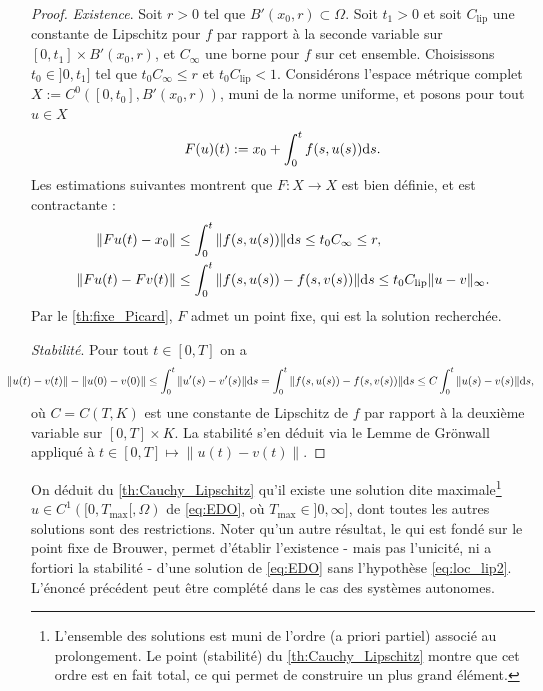 \begin{proof}
	\emph{Existence}.
	Soit $r>0$ tel que $B'(x_0,r) \subset \Omega$. Soit $t_1 > 0$ et soit $C_{\mathrm{lip}}$ une constante de Lipschitz pour $f$ par rapport à la seconde variable sur $[0,t_1] \times B'(x_0,r)$, et $C_\infty$ une borne pour $f$ sur cet ensemble. 
	Choisissons $t_0 \in ]0,t_1]$ tel que $t_0 C_\infty \leq r$ et $t_0 C_{\mathrm{lip}} <1$. 
	Considérons l'espace métrique complet $X := C^0([0,t_0],B'(x_0,r))$, muni de la norme uniforme, et posons pour tout $u \in X$ 
	\begin{equation*}
		F (u) (t) := x_0 + \int_0^t f(s,u(s)) \mathrm{d} s.
	\end{equation*}
	Les estimations suivantes montrent que $F : X \to X$ est bien définie, et est contractante : 
	\begin{align*}
		\|F u(t) -x_0 \| &\leq \int_0^t \|f(s,u(s))\| \mathrm{d} s \leq t_0 C_\infty \leq r,\\
		\|F u(t) - F v(t)\| &\leq \int_0^t \|f(s,u(s)) - f(s,v(s))\|\mathrm{d} s \leq t_0 C_{\mathrm{lip}} \|u-v\|_\infty.
	\end{align*}
	Par le \cref{th:fixe_Picard}, $F$ admet un point fixe, qui est la solution recherchée. 
	
	\emph{Stabilité}.
	Pour tout $t \in [0,T]$ on a 
	\begin{equation*}
	\hspace{-0.8cm}
		\| u(t)-v(t)\| - \|u(0)-v(0)\| 
		\leq \int_0^t  \|u'(s)-v'(s) \| \diff s  
		= \int_0^t \|f(s,u(s))-f(s,v(s))\|\diff s 
		\leq C \int_0^t \|u(s)-v(s)\| \diff s, 
	\end{equation*}
	où $C = C(T,K)$ est une constante de Lipschitz de $f$ par rapport à la deuxième variable sur $[0,T] \times K$. La stabilité s'en déduit via le Lemme de Grönwall appliqué à $t\in [0,T] \mapsto \| u(t)-v(t)\|$.
\end{proof}

On déduit du \cref{th:Cauchy_Lipschitz} qu'il existe une solution dite maximale\footnote{L'ensemble des solutions est muni de l'ordre (a priori partiel) associé au prolongement. Le point (stabilité) du \cref{th:Cauchy_Lipschitz} montre que cet ordre est en fait total, ce qui permet de construire un plus grand élément.}  $u \in C^1([0,T_{\max}[,\Omega)$ de \eqref{eq:EDO}, où $T_{\max} \in ]0,\infty]$, dont toutes les autres solutions sont des restrictions.
Noter qu'un autre résultat, le  qui est fondé sur le point fixe de Brouwer, permet d'établir l'existence - mais pas l'unicité, ni a fortiori la stabilité - d'une solution de \eqref{eq:EDO} sans l'hypothèse \eqref{eq:loc_lip2}. L'énoncé précédent peut être complété dans le cas des systèmes autonomes.



